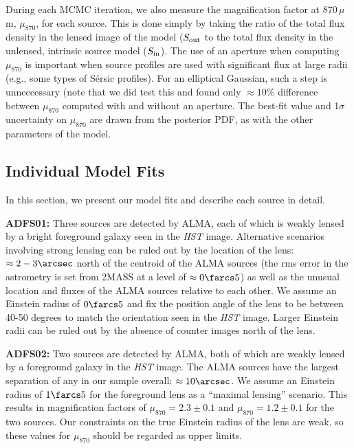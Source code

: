 \documentclass[iop]{emulateapj}
\begin{document}
During each MCMC iteration, we also measure the magnification factor at
870$\,\mu$m, $\mu_{870}$, for each source.  This is done simply by taking the
ratio of the total flux density in the lensed image of the model ($S_{\rm out}$
to the total flux density in the unlensed, intrinsic source model ($S_{\rm
in}$).  The use of an aperture when computing $\mu_{870}$ is important when
source profiles are used with significant flux at large radii (e.g., some types
of S\'ersic profiles).  For an elliptical Gaussian, such a step is unneccessary
(note that we did test this and found only $\approx 10\%$ difference between
$\mu_{870}$ computed with and without an aperture.  The best-fit value and
1$\sigma$ uncertainty on $\mu_{870}$ are drawn from the posterior PDF, as with
the other parameters of the model.

\subsection{Individual Model Fits}\label{objectbyobject}

In this section, we present our model fits and describe each source in detail.

{\bf ADFS01:} Three sources are detected by ALMA, each of which is weakly
lensed by a bright foreground galaxy seen in the {\it HST} image.  Alternative
scenarios involving strong lensing can be ruled out by the location of the
lens: $\approx 2-3\arcsec$ north of the centroid of the ALMA sources (the rms
error in the astrometry is set from 2MASS at a level of $\approx 0\farcs5$) as
well as the unusual location and fluxes of the ALMA sources relative to each
other.  We assume an Einstein radius of $0\farcs5$ and fix the position angle
of the lens to be between 40-50 degrees to match the orientation seen in the
{\it HST} image.  Larger Einstein radii can be ruled out by the absence of
counter images north of the lens.

{\bf ADFS02:} Two sources are detected by ALMA, both of which are weakly lensed
by a foreground galaxy in the {\it HST} image.  The ALMA sources have the
largest separation of any in our sample overall: $\approx 10\arcsec$.  We
assume an Einstein radius of $1\farcs5$ for the foreground lens as a ``maximal
lensing'' scenario.  This results in magnification factors of $\mu_{870} = 2.3
\pm 0.1$ and $\mu_{870} = 1.2 \pm 0.1$ for the two sources.  Our constraints on
the true Einstein radius of the lens are weak, so these values for $\mu_{870}$
should be regarded as upper limits.
\end{document}
